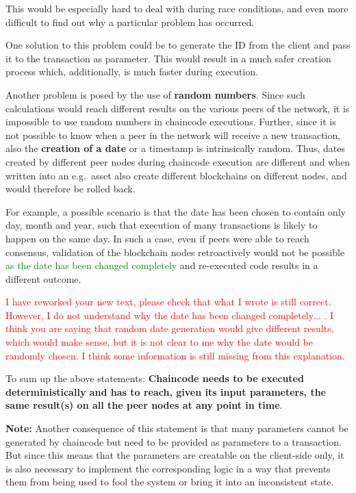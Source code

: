 This would be especially hard to deal with during race conditions, and even more difficult to find out why a particular problem has occurred.

One solution to this problem could be to generate the ID from the client and pass it to the transaction as parameter. This would result in a much safer creation process which, additionally, is much faster during execution.

Another problem is posed by the use of \textbf{random numbers}. Since such calculations would reach different results on the various peers of the network, it is impossible to use random numbers in chaincode executions. Further, since it is not possible to know when a peer in the network will receive a new transaction, also the \textbf{creation of a date} or a timestamp is intrinsically random. Thus, dates created by different peer nodes during chaincode execution are different and when written into an e.g.\ asset also create different blockchains on different nodes, and would therefore be rolled back.

For example, a possible scenario is that the date has been chosen to contain only day, month and year, such that execution of many transactions is likely to happen on the same day. In such a case, even if peers were able to reach consensus, validation of the blockchain nodes retroactively would not be possible \textcolor{green}{as the date has been changed completely} and re-executed code results in a different outcome.

\textcolor{red}{I have reworked your new text, please check that what I wrote is still correct. However, I do not understand why the date has been changed completely... . I think you are saying that random date generation would give different results, which would make sense, but it is not clear to me why the date would be randomly chosen. I think some information is still missing from this explanation.}

To sum up the above statements: \textbf{Chaincode needs to be executed deterministically and has to reach, given its input parameters, the same result(s) on all the peer nodes at any point in time}.

\textbf{Note:} Another consequence of this statement is that many parameters cannot be generated by chaincode but need to be provided as parameters to a transaction. But since this means that the parameters are creatable on the client-side only, it is also necessary to implement the corresponding logic in a way that prevents them from being used to fool the system or bring it into an inconsistent state.

